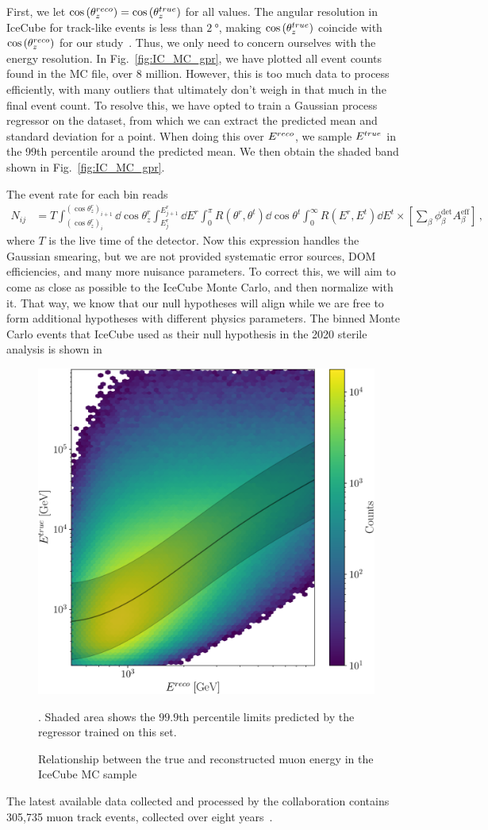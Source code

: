 \documentclass{thesis}
\begin{document}
First, we let $\cos{(\theta_z^{reco})} = \cos{(\theta_z^{true})}$ for all values. The angular resolution in IceCube for track-like events is less than $\SI{2}{\degree}$, making $\cos{(\theta_z^{true})}$ coincide with $\cos{(\theta_z^{reco})}$ for our study~\cite{IC2020}.
Thus, we only need to concern ourselves with the energy resolution.
In Fig.~\ref{fig:IC_MC_gpr}, we have plotted all event counts found in the MC file, over 8 million. However, this is too much data to process efficiently, with many outliers that ultimately don't weigh in 
that much in the final event count. To resolve this, we have opted to train a Gaussian process regressor on the dataset, from which we can extract the predicted mean and standard deviation for a point.
When doing this over $E^{reco}$, we sample $E^{true}$ in the 99th percentile around the predicted mean. We then obtain the shaded band shown in Fig.~\ref{fig:IC_MC_gpr}. %

The event rate for each bin reads
\begin{align}\label{eq:ICevents}
    N_{ij} &= T \int_{(\cos{\theta_z^r})_i}^{(\cos{\theta_z^r})_{i+1}} \dd \cos{\theta^r_z} \int_{E^r_{j}}^{E^r_{j+1}} \dd E^r \int_0^\pi R(\theta^r,\theta^t) \dd \cos{\theta^t} \int_0^\infty R(E^r,E^t) \dd E^t
    \times \left[ \sum_\beta \phi_\beta^\text{det}  A^\text{eff}_\beta\right]\,,
\end{align}
where $T$ is the live time of the detector. Now this expression handles the Gaussian smearing, but we are not provided systematic error sources, DOM efficiencies, and many more nuisance parameters. To correct this,
we will aim to come as close as possible to the IceCube Monte Carlo, and then normalize with it. That way, we know that our null hypotheses will align while we are free to form additional hypotheses with different 
physics parameters. The binned Monte Carlo events that IceCube used as their null hypothesis in the 2020 sterile analysis is shown in %


\begin{figure}[!tb]\label{fig:IC_MC_gpr}
    \begin{center}
       \includegraphics[width=0.4\linewidth]{figures/IC_MC_gpr.pdf}
    \end{center}
    \caption{Relationship between the true and reconstructed muon energy in the IceCube MC sample~\cite{IC2016}}\label{fig:IC_MC_counts}. Shaded area shows the $99.9$th percentile limits predicted by the regressor trained on this set.
 \end{figure}

The latest available data collected and processed by the collaboration contains 305,735 muon track events, collected over eight years~\cite{IC2020}. 
\newpage


\end{document}
